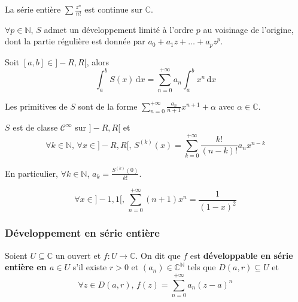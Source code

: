   \begin{example}
    La série entière $\sum \frac{z^n}{n!}$ est continue sur $\mathbb{C}$.
  \end{example}

  \begin{corollary}
    $\forall p \in \mathbb{N}$, $S$ admet un développement limité à l'ordre $p$ au voisinage de l'origine, dont la partie régulière est donnée par $a_0 + a_1z + \dots + a_pz^p$.
  \end{corollary}

  \begin{proposition}
    Soit $[a, b] \in ]-R, R[$, alors
    \[ \int_{a}^{b} S(x) \, \mathrm{d}x = \sum_{n=0}^{+\infty} a_n \int_{a}^{b} x^n \, \mathrm{d}x \]
  \end{proposition}

  \begin{corollary}
    Les primitives de $S$ sont de la forme $\sum_{n=0}^{+\infty} \frac{a_n}{n+1} x^{n+1} + \alpha$ avec $\alpha \in \mathbb{C}$.
  \end{corollary}

  \begin{proposition}
    $S$ est de classe $\mathcal{C}^\infty$ sur $]-R,R[$ et
    \[ \forall k \in \mathbb{N}, \, \forall x \in ]-R,R[, \, S^{(k)}(x) = \sum_{k = 0}^{+\infty} \frac{k!}{(n-k)!} a_n x^{n-k} \]
  \end{proposition}

  \begin{remark}
    En particulier, $\forall k \in \mathbb{N}$, $a_k = \frac{S^{(k)}(0)}{k!}$.
  \end{remark}

  \begin{example}
    \[ \forall x \in ]-1, 1[, \, \sum_{n=0}^{+\infty} (n+1)x^n = \frac{1}{(1-x)^2} \]
  \end{example}

  \subsubsection{Développement en série entière}


  \begin{definition}
    Soient $U \subseteq \mathbb{C}$ un ouvert et $f : U \rightarrow \mathbb{C}$. On dit que $f$ est \textbf{développable en série entière en $a \in U$} s'il existe $r > 0$ et $(a_n) \in \mathbb{C}^{\mathbb{N}}$ tels que $D(a, r) \subseteq U$ et
    \[ \forall z \in D(a, r), \, f(z) = \sum_{n=0}^{+\infty} a_n (z-a)^n \]
  \end{definition}

